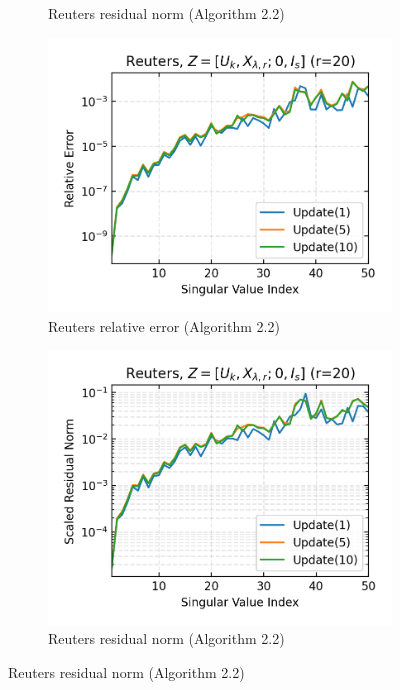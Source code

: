\begin{figure}[H]
\begin{subfigure}[b]{0.48\textwidth}
    \caption{Reuters residual norm (Algorithm 2.2)}
  \end{subfigure}
  \hfill
  \begin{subfigure}[b]{0.48\textwidth}
    \centering
    \includegraphics[width=\textwidth]{figures/reuters/Reuters_bcg_n_batches_10_k_dims_50_rval_20_rel_err.png}
    \caption{Reuters relative error (Algorithm 2.2)}
  \end{subfigure}
  \hfill
  \begin{subfigure}[b]{0.48\textwidth}
    \centering
    \includegraphics[width=\textwidth]{figures/reuters/Reuters_bcg_n_batches_10_k_dims_50_rval_20_res_norm.png}
    \caption{Reuters residual norm (Algorithm 2.2)}
  \end{subfigure}
\end{figure}

